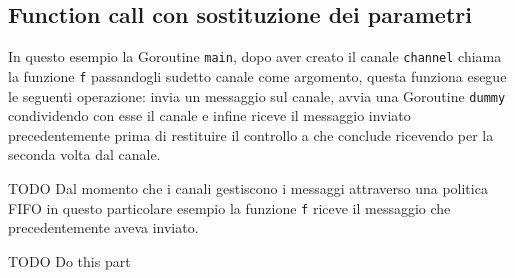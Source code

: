 \subsection{Function call con sostituzione dei parametri}
In questo esempio la Goroutine \texttt{main}, dopo aver creato il canale \texttt{channel} chiama la funzione \texttt{f} passandogli sudetto canale come argomento, questa funziona esegue le seguenti operazione: invia un messaggio sul canale, avvia una Goroutine \texttt{dummy} condividendo con esse il canale e infine riceve il messaggio inviato precedentemente prima di restituire il controllo a  che conclude ricevendo per la seconda volta dal canale.

TODO Dal momento che i canali gestiscono i messaggi attraverso una politica FIFO in questo particolare esempio la funzione \texttt{f} riceve il messaggio che precedentemente aveva inviato.
\begin{figure}[h!]
\end{figure}
TODO Do this part %
\begin{figure}[h!]
\end{figure}

